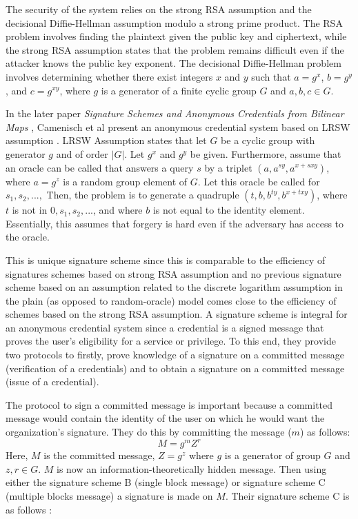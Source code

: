 The security of the system relies on the strong RSA assumption and the decisional Diffie-Hellman assumption modulo a strong prime product. The RSA problem involves finding the plaintext given the public key and ciphertext, while the strong RSA assumption states that the problem remains difficult even if the attacker knows the public key exponent. The decisional Diffie-Hellman problem involves determining whether there exist integers $x$ and $y$ such that $a=g^x$, $b=g^y$, and $c=g^{xy}$, where $g$ is a generator of a finite cyclic group $G$ and $a, b, c \in G$.


In the later paper \textit{Signature Schemes and Anonymous Credentials from Bilinear Maps} \cite{Camenisch2004SignatureSA}, Camenisch et al present an anonymous credential system based on LRSW assumption \cite{annaPsuedonym}. LRSW Assumption states that let $G$ be a cyclic group with generator $g$ and of order $|G|$. Let $g^x$ and $g^y$ be given. Furthermore, assume that an oracle can be called that answers a query $s$ by a triplet $(a, a^{sy}, a^{x+sxy})$, where $a=g^z$ is a random group element of $G$. Let this oracle be called for $s_1, s_2, ...,$ Then, the problem is to generate a quadruple $(t, b, b^{ty}, b^{x+txy})$, where $t$ is not in ${0, s_1, s_2, ...}$, and where $b$ is not equal to the identity element. Essentially, this assumes that forgery is hard even if the adversary has access to the oracle.

This is unique signature scheme since this is comparable to the efficiency of signatures schemes based on strong RSA assumption and no previous signature scheme based on an assumption related to the discrete logarithm assumption in the plain (as opposed to random-oracle) model comes close to the efficiency of schemes based on the strong RSA assumption. A signature scheme is integral for an anonymous credential system since a credential is a signed message that proves the user's eligibility for a service or privilege. To this end, they provide two protocols to firstly, prove knowledge of a signature on a committed message (verification of a credentials) and to obtain a signature on a committed message (issue of a credential).
 
The protocol to sign a committed message is important because a committed message would contain the identity of the user on which he would want the organization's signature. They do this by committing the message ($m$) as follows: 
\begin{equation}
    M = g^m Z^r
\end{equation}
Here, $M$ is the committed message, $Z = g^z$ where $g$ is a generator of group $G$ and $z, r \in G$. $M$ is now an information-theoretically hidden message. Then using either the signature scheme B (single block message) or signature scheme C (multiple blocks message) a signature is made on $M$.
Their signature scheme C is as follows \cite{Camenisch2004SignatureSA}:

